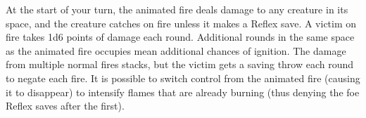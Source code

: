 {	At the start of your turn, the animated fire deals damage to any creature in its space, and the creature catches on fire unless it makes a Reflex save. A victim on fire takes 1d6 points of damage each round. Additional rounds in the same space as the animated fire occupies mean additional chances of ignition. The damage from multiple normal fires stacks, but the victim gets a saving throw each round to negate each fire. It is possible to switch control from the animated fire (causing it to disappear) to intensify flames that are already burning (thus denying the foe Reflex saves after the first).
}
